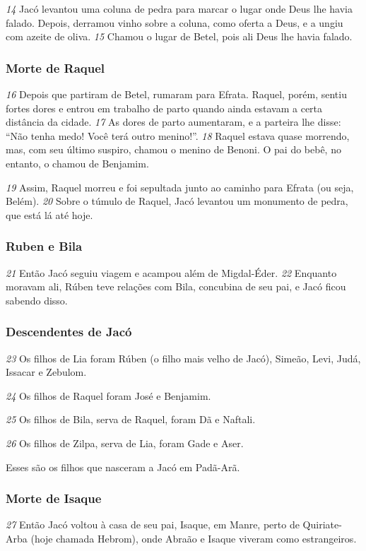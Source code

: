 \bigskip   
\textit{\tiny 14}
Jacó levantou uma coluna de pedra para marcar o lugar onde Deus lhe havia
falado. Depois, derramou vinho sobre a coluna, como oferta a Deus, e a ungiu com
azeite de oliva. 
\textit{\tiny 15}
Chamou o lugar de Betel,
 pois ali Deus lhe havia falado.

\bigskip   
\subsubsection*{Morte de Raquel}
\textit{\tiny 16}
Depois que partiram de Betel, rumaram para Efrata. Raquel, porém, sentiu
fortes dores e entrou em trabalho de parto quando ainda estavam a certa
distância da cidade. 
\textit{\tiny 17}
As dores de parto aumentaram, e a parteira lhe disse: “Não
tenha medo! Você terá outro menino!”. 
\textit{\tiny 18}
Raquel estava quase morrendo, mas,
com seu último suspiro, chamou o menino de Benoni.
 O pai do bebê, no
entanto, o chamou de Benjamim.
 
\bigskip   
\textit{\tiny 19}
Assim, Raquel morreu e foi sepultada junto
ao caminho para Efrata (ou seja, Belém). 
\textit{\tiny 20}
Sobre o túmulo de Raquel, Jacó
levantou um monumento de pedra, que está lá até hoje.
   
\bigskip   
\subsubsection*{Ruben e Bila}
\textit{\tiny 21}
Então Jacó
 seguiu viagem e acampou além de Migdal-Éder. 
\textit{\tiny 22}
Enquanto
moravam ali, Rúben teve relações com Bila, concubina de seu pai, e Jacó ficou
sabendo disso.


\bigskip   
\subsubsection*{Descendentes de Jacó}
\textit{\tiny 23}
Os  filhos de Lia foram Rúben (o filho mais velho de Jacó), Simeão, Levi, Judá,
 Issacar e Zebulom.

\bigskip   
\textit{\tiny 24}
Os filhos de Raquel foram José e Benjamim.

\bigskip   
\textit{\tiny 25}
Os filhos de Bila, serva de Raquel, foram Dã e Naftali.

\bigskip   
\textit{\tiny 26}
Os filhos de Zilpa, serva de Lia, foram Gade e Aser.

\bigskip   
Esses são os filhos que nasceram a Jacó em Padã-Arã.

\bigskip   
\subsubsection*{Morte de Isaque}
\textit{\tiny 27}
Então Jacó voltou à casa de seu pai, Isaque, em Manre, perto de Quiriate-Arba
(hoje chamada Hebrom), onde Abraão e Isaque viveram como estrangeiros.

